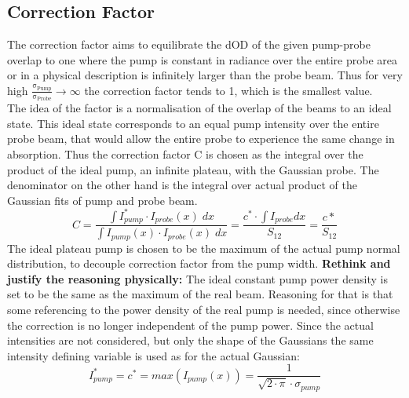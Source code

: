 \documentclass[twoside,openright]{scrreprt}
\begin{document}
\subsection{Correction Factor}\label{sec:CorrFactor}
The correction factor aims to equilibrate the dOD of the given pump-probe overlap to one where the pump is constant in radiance over the entire probe area or in a physical description is infinitely larger than the probe beam. 
Thus for very high $\mathrm{\frac{\sigma_{Pump}}{\sigma_{Probe}} \rightarrow \infty}$ the correction factor tends to 1, which is the smallest value.\\
The idea of the factor is a normalisation of the overlap of the beams to an ideal state. This ideal state corresponds to an equal pump intensity over the entire probe beam, that would allow the entire probe to experience the same change in absorption. Thus the correction factor C is chosen as the integral over the product of the ideal pump, an infinite plateau, with the Gaussian probe. The denominator on the other hand is the integral over actual product of the Gaussian fits of pump and probe beam.
\begin{equation}\label{eq:CorrFactorGaussians}
C = \dfrac{\int I_{pump}^*\cdot I_{probe}(x) \;dx}{\int I_{pump}(x)\cdot I_{probe}(x) \; dx} = \dfrac{c^*\cdot \int I_{probe} dx}{S_{12}} = \dfrac{c*}{S_{12}}
\end{equation}
The ideal plateau pump is chosen to be the maximum of the actual pump normal distribution, to decouple correction factor from the pump width. \textbf{Rethink and justify the reasoning physically:  } The ideal constant pump power density is set to be the same as the maximum of the real beam. Reasoning for that is that some referencing to the power density of the real pump is needed, since otherwise the correction is no longer independent of the pump power. Since the actual intensities are not considered, but only the shape of the Gaussians the same intensity defining variable is used as for the actual Gaussian:
\begin{equation*}
I_{pump}^* = c^* = max(I_{pump}(x)) = \frac{1}{\sqrt{2\cdot\pi}\cdot\sigma_{pump}}
\end{equation*}
\end{document}
